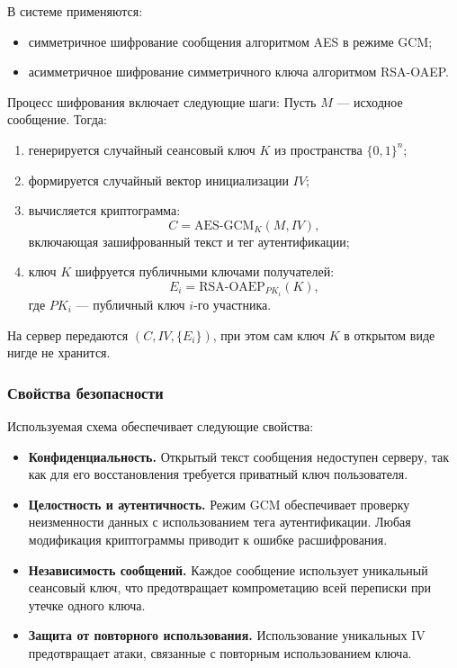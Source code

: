 \documentclass{article}
\begin{document}
В системе применяются:
\begin{itemize}
\item симметричное шифрование сообщения алгоритмом AES в режиме GCM;
\item асимметричное шифрование симметричного ключа алгоритмом RSA-OAEP.
\end{itemize}

Процесс шифрования включает следующие шаги: Пусть $M$ — исходное сообщение. Тогда:
\begin{enumerate}
\item генерируется случайный сеансовый ключ $K$ из пространства $\{0,1\}^n$;
\item формируется случайный вектор инициализации $IV$;
\item вычисляется криптограмма:
\[
C = \text{AES-GCM}_K(M, IV),
\]
включающая зашифрованный текст и тег аутентификации;
\item ключ $K$ шифруется публичными ключами получателей:
\[
E_i = \text{RSA-OAEP}_{PK_i}(K),
\]
где $PK_i$ — публичный ключ $i$-го участника.
\end{enumerate}

На сервер передаются $(C, IV, \{E_i\})$, при этом сам ключ $K$ в открытом виде нигде не хранится.

\subsubsection{Свойства безопасности}

Используемая схема обеспечивает следующие свойства:

\begin{itemize}
\item \textbf{Конфиденциальность.}  
Открытый текст сообщения недоступен серверу, так как для его восстановления требуется приватный ключ пользователя.

\item \textbf{Целостность и аутентичность.}  
Режим GCM обеспечивает проверку неизменности данных с использованием тега аутентификации. Любая модификация криптограммы приводит к ошибке расшифрования.

\item \textbf{Независимость сообщений.}  
Каждое сообщение использует уникальный сеансовый ключ, что предотвращает компрометацию всей переписки при утечке одного ключа.

\item \textbf{Защита от повторного использования.}  
Использование уникальных IV предотвращает атаки, связанные с повторным использованием ключа.
\end{itemize}
\end{document}
